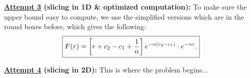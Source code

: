 \documentclass[12pt]{article}
\begin{document}
\textbf{\underline{Attempt 3} (slicing in 1D \& optimized computation):}
To make sure the upper bound easy to compute, we use the simplified versions which are in the round boxes before, which gives the following:
\begin{align*}
    \boxed{F(r) = \left[ r + c_2 - c_1 + \frac{1}{\alpha} \right]e^{-\alpha(c_2 - c_1)} \cdot e^{-\alpha r}.}
\end{align*}

\textbf{\underline{Attempt 4} (slicing in 2D):} This is where the problem begins...
\end{document}
